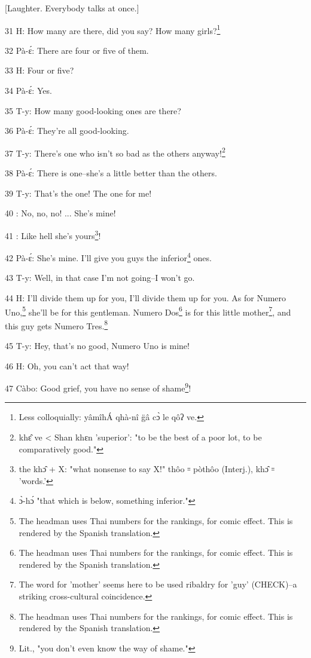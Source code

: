 \begin{center}
[Laughter. Everybody talks at once.]
\end{center}

\leftskip=0pt
31 H: How many are there, did you say? How many girls?\footnote{Less colloquially: yâmîhÁ qhà-nî g̈â cɔ̀ le qôʔ ve.}

32 Pà-ɛ́: There are four or five of them.

33 H: Four or five?

34 Pà-ɛ́: Yes.

35 T-y: How many good-looking ones are there?

36 Pà-ɛ́: They're all good-looking.

37 T-y: There's one who isn't so bad as the others anyway!\footnote{khɛ̂ ve < Shan khɛn 'superior': "to be the best of a poor lot, to be comparatively good."}

38 Pà-ɛ́: There is one--she's a little better than the others.

39 T-y: That's the one! The one for me!

40       : No, no, no! ... She's mine!

41       : Like hell she's yours\footnote{the khɔ̂ + X: "what nonsense to say X!" thôo ꞊ pòthôo (Interj.), khɔ̂ ꞊ 'words.'}!

42 Pà-ɛ́: She's mine. I'll give you guys the inferior\footnote{ɔ̀-hɔ́ "that which is below, something inferior."} ones.

43 T-y: Well, in that case I'm not going--I won't go.

44 H: I'll divide them up for you, I'll divide them up for you. As for Numero Uno,\footnote{The headman uses Thai numbers for the rankings, for comic effect. This is rendered by the Spanish translation.}
she'll be for this gentleman. Numero Dos\footnote{The headman uses Thai numbers for the rankings, for comic effect. This is rendered by the Spanish translation.} is for this little mother\footnote{The word for 'mother' seems here to be used ribaldry for 'guy' (CHECK)--a striking cross-cultural coincidence.}, and
this guy gets Numero Tres.\footnote{The headman uses Thai numbers for the rankings, for comic effect. This is rendered by the Spanish translation.}

45 T-y: Hey, that's no good, Numero Uno is mine!

46 H: Oh, you can't act that way!

47 Càbo: Good grief, you have no sense of shame\footnote{Lit., "you don't even know the way of shame."}!

